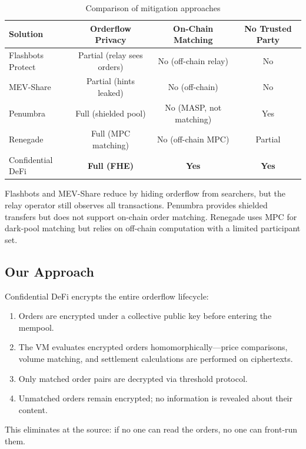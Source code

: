 \begin{table}[h]
\centering
\begin{tabular}{lccc}
\toprule
\textbf{Solution} & \textbf{Orderflow Privacy} & \textbf{On-Chain Matching} & \textbf{No Trusted Party} \\
\midrule
Flashbots Protect & Partial (relay sees orders) & No (off-chain relay) & No \\
MEV-Share & Partial (hints leaked) & No (off-chain) & No \\
Penumbra & Full (shielded pool) & No (MASP, not matching) & Yes \\
Renegade & Full (MPC matching) & No (off-chain MPC) & Partial \\
\Zoo{} Confidential DeFi & \textbf{Full (FHE)} & \textbf{Yes} & \textbf{Yes} \\
\bottomrule
\end{tabular}
\caption{Comparison of \MEV{} mitigation approaches}
\label{tab:mev_comparison}
\end{table}

Flashbots and MEV-Share reduce \MEV{} by hiding orderflow from searchers, but the relay operator still observes all transactions. Penumbra provides shielded transfers but does not support on-chain order matching. Renegade uses MPC for dark-pool matching but relies on off-chain computation with a limited participant set.

\subsection{Our Approach}

\Zoo{} Confidential DeFi encrypts the entire orderflow lifecycle:

\begin{enumerate}
    \item Orders are encrypted under a collective \FHE{} public key before entering the mempool.
    \item The \DEX{} VM evaluates encrypted orders homomorphically---price comparisons, volume matching, and settlement calculations are performed on ciphertexts.
    \item Only matched order pairs are decrypted via \TChain{} threshold protocol.
    \item Unmatched orders remain encrypted; no information is revealed about their content.
\end{enumerate}

This eliminates \MEV{} at the source: if no one can read the orders, no one can front-run them.

